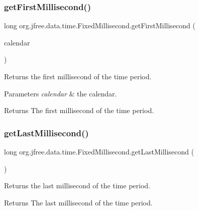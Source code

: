 \subsubsection{\texorpdfstring{get\+First\+Millisecond()}{getFirstMillisecond()}\hspace{0.1cm}{\footnotesize\ttfamily [2/2]}}
{\footnotesize\ttfamily long org.\+jfree.\+data.\+time.\+Fixed\+Millisecond.\+get\+First\+Millisecond (\begin{DoxyParamCaption}\item[{Calendar}]{calendar }\end{DoxyParamCaption})}

Returns the first millisecond of the time period.


\begin{DoxyParams}{Parameters}
{\em calendar} & the calendar.\\
\hline
\end{DoxyParams}
\begin{DoxyReturn}{Returns}
The first millisecond of the time period. 
\end{DoxyReturn}
\mbox{\label{classorg_1_1jfree_1_1data_1_1time_1_1_fixed_millisecond_a79ddbfc6873cc821afbc9f6fda97194f}} 
\subsubsection{\texorpdfstring{get\+Last\+Millisecond()}{getLastMillisecond()}\hspace{0.1cm}{\footnotesize\ttfamily [1/2]}}
{\footnotesize\ttfamily long org.\+jfree.\+data.\+time.\+Fixed\+Millisecond.\+get\+Last\+Millisecond (\begin{DoxyParamCaption}{ }\end{DoxyParamCaption})}

Returns the last millisecond of the time period.

\begin{DoxyReturn}{Returns}
The last millisecond of the time period. 
\end{DoxyReturn}
\mbox{\label{classorg_1_1jfree_1_1data_1_1time_1_1_fixed_millisecond_aeb9356f3a9c22367e5c47d4cd3be0fff}} 

